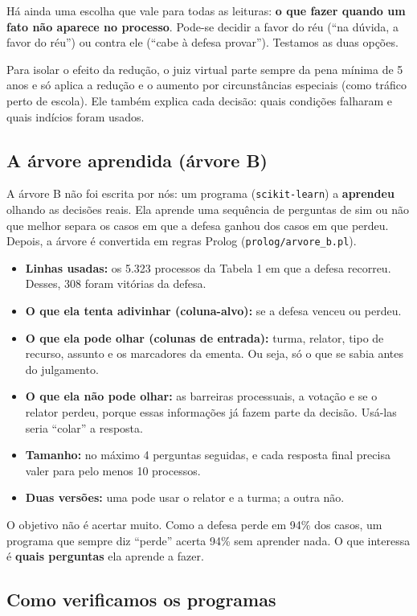 Há ainda uma escolha que vale para todas as leituras: \textbf{o que fazer quando um fato não
aparece no processo}. Pode-se decidir a favor do réu (``na dúvida, a favor do réu'') ou
contra ele (``cabe à defesa provar''). Testamos as duas opções.

Para isolar o efeito da redução, o juiz virtual parte sempre da pena mínima de 5 anos e só
aplica a redução e o aumento por circunstâncias especiais (como tráfico perto de escola).
Ele também explica cada decisão: quais condições falharam e quais indícios foram usados.

\subsection*{A árvore aprendida (árvore B)}

A árvore B não foi escrita por nós: um programa (\texttt{scikit-learn}) a \textbf{aprendeu}
olhando as decisões reais. Ela aprende uma sequência de perguntas de sim ou não que melhor
separa os casos em que a defesa ganhou dos casos em que perdeu. Depois, a árvore é
convertida em regras Prolog (\texttt{prolog/arvore\_b.pl}).
\begin{itemize}
  \item \textbf{Linhas usadas:} os 5.323 processos da Tabela 1 em que a defesa recorreu.
        Desses, 308 foram vitórias da defesa.
  \item \textbf{O que ela tenta adivinhar (coluna-alvo):} se a defesa venceu ou perdeu.
  \item \textbf{O que ela pode olhar (colunas de entrada):} turma, relator, tipo de recurso,
        assunto e os marcadores da ementa. Ou seja, só o que se sabia antes do julgamento.
  \item \textbf{O que ela não pode olhar:} as barreiras processuais, a votação e se o relator
        perdeu, porque essas informações já fazem parte da decisão. Usá-las seria ``colar''
        a resposta.
  \item \textbf{Tamanho:} no máximo 4 perguntas seguidas, e cada resposta final precisa valer
        para pelo menos 10 processos.
  \item \textbf{Duas versões:} uma pode usar o relator e a turma; a outra não.
\end{itemize}
O objetivo não é acertar muito. Como a defesa perde em 94\% dos casos, um programa que
sempre diz ``perde'' acerta 94\% sem aprender nada. O que interessa é \textbf{quais
perguntas} ela aprende a fazer.

\subsection*{Como verificamos os programas}

